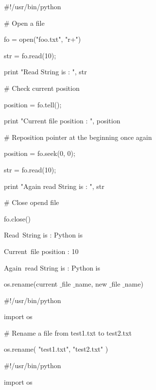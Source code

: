 \vspace{12pt}
\noindent 
$  \#  $!/usr/bin/python \par
\vspace{12pt}
\noindent 
$  \#  $ Open a file \par
\noindent 
fo = open("foo.txt", "r+") \par
\noindent 
str = fo.read(10); \par
\noindent 
print "Read String is : ", str \par
\vspace{12pt}
\noindent 
$  \#  $ Check current position \par
\noindent 
position = fo.tell(); \par
\noindent 
print "Current file position : ", position \par
\vspace{12pt}
\noindent 
$  \#  $ Reposition pointer at the beginning once again \par
\noindent 
position = fo.seek(0, 0); \par
\noindent 
str = fo.read(10); \par
\noindent 
print "Again read String is : ", str \par
\noindent 
$  \#  $ Close opend file \par
\noindent 
fo.close() \par
\vspace{12pt}
\noindent 
Read~String is :  Python is \par
\noindent 
Current~file position :  10 \par
\noindent 
Again~read String is :  Python is \par
\vspace{12pt}
\noindent 
os.rename(current $  \_  $file $  \_  $name, new $  \_  $file $  \_  $name) \par
\vspace{12pt}
\noindent 
$  \#  $!/usr/bin/python \par
\noindent 
import os \par
\vspace{12pt}
\noindent 
$  \#  $ Rename a file from test1.txt to test2.txt \par
\noindent 
os.rename( "test1.txt", "test2.txt" ) \par
\vspace{12pt}
\noindent 
$  \#  $!/usr/bin/python \par
\noindent 
import os \par
\vspace{12pt}
